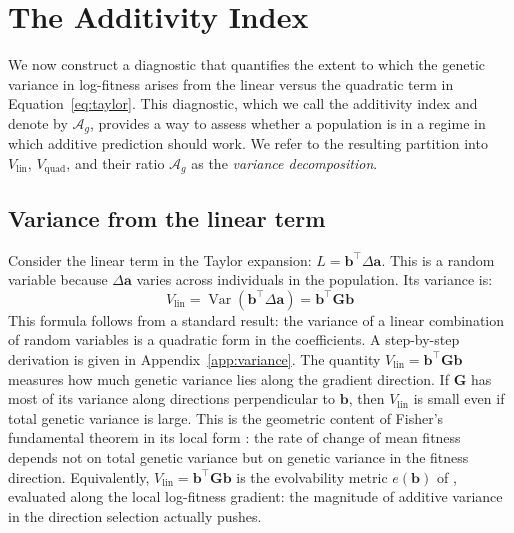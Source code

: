 \documentclass[9pt,twocolumn,twoside,lineno]{gsajnl}
\newcommand{\vect}[1]{\boldsymbol{#1}}
\newcommand{\mat}[1]{\mathbf{#1}}
\newcommand{\Ag}{\ensuremath{\mathcal{A}_{g}}\xspace}
\newcommand{\Vlin}{\ensuremath{V_{\text{lin}}}\xspace}
\newcommand{\Vquad}{\ensuremath{V_{\text{quad}}}\xspace}
\newcommand{\Var}{\ensuremath{\operatorname{Var}}\xspace}
\begin{document}

\section{The Additivity Index}
\label{sec:additivity}

We now construct a diagnostic that quantifies the extent to which the genetic variance in log-fitness arises from the linear versus the quadratic term in Equation~\eqref{eq:taylor}. This diagnostic, which we call the additivity index and denote by \Ag, provides a way to assess whether a population is in a regime in which additive prediction should work. We refer to the resulting partition into $\Vlin$, $\Vquad$, and their ratio \Ag as the \emph{variance decomposition}.

\subsection{Variance from the linear term}

Consider the linear term in the Taylor expansion: $L = \vect{b}^\top \Delta\vect{a}$. This is a random variable because $\Delta\vect{a}$ varies across individuals in the population. Its variance is:
\begin{equation}
\Vlin = \Var(\vect{b}^\top \Delta\vect{a}) = \vect{b}^\top \mat{G} \vect{b}
\label{eq:Vlin}
\end{equation}
This formula follows from a standard result: the variance of a linear combination of random variables is a quadratic form in the coefficients. A step-by-step derivation is given in Appendix~\ref{app:variance}. The quantity $\Vlin = \vect{b}^\top \mat{G} \vect{b}$ measures how much genetic variance lies along the gradient direction. If $\mat{G}$ has most of its variance along directions perpendicular to $\vect{b}$, then $\Vlin$ is small even if total genetic variance is large. This is the geometric content of Fisher's fundamental theorem in its local form \citep{Fisher1930, Price1972}: the rate of change of mean fitness depends not on total genetic variance but on genetic variance in the fitness direction. Equivalently, $\Vlin = \vect{b}^{\top}\mat{G}\vect{b}$ is the evolvability metric $e(\vect{b})$ of \citet{HansenHoule2008}, evaluated along the local log-fitness gradient: the magnitude of additive variance in the direction selection actually pushes.
\end{document}
